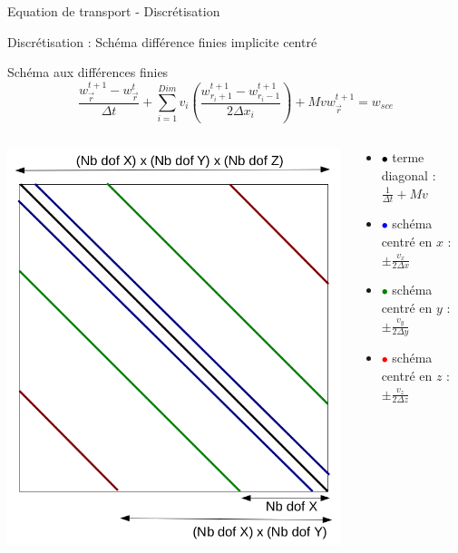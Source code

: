 \begin{frame}{Equation de transport - Discrétisation}
\begin{alertblock}{Discrétisation : Schéma différence finies implicite centré}
  \end{alertblock}

\end{frame}

\begin{frame}{Schéma aux différences finies}
  \begin{equation*}
    \frac{w_{\vec{r}}^{t+1} - w_{\vec{r}}^{t}}{\Delta t} + 
    \sum \limits_{i=1}^{Dim} v_i \left( \frac{w_{r_i+1}^{t+1} - w_{r_i-1}^{t+1}}{2 \Delta x_i} \right)
    + Mvw_{\vec{r}}^{t+1} = w_{sce}
  \end{equation*}

  \begin{columns}[c]
    \begin{column}{5cm}
      \centering
      \includegraphics[scale=0.3]{Figures/FD_matrix.png}
    \end{column}
    \begin{column}{6.5cm}
      \begin{itemize}[label=$\rightarrow$]
      \item \textcolor{black}{$\bullet$} terme diagonal : $\frac{1}{\Delta t} + Mv$
      \item \textcolor{blue}{$\bullet$} schéma centré en $x$ : $\pm \frac{v_x}{2\Delta x}$
      \item \textcolor{green}{$\bullet$} schéma centré en $y$ : $\pm \frac{v_y}{2\Delta y}$
      \item \textcolor{red}{$\bullet$} schéma centré en $z$ : $\pm \frac{v_z}{2\Delta z}$
      \end{itemize}
    \end{column}
  \end{columns} 


\end{frame}
